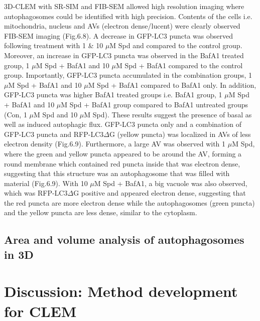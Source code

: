 3D-CLEM with SR-SIM and FIB-SEM allowed high resolution imaging where autophagosomes could be identified with high precision. Contents of the cells i.e. mitochondria, nucleus and AVs (electron dense/lucent) were clearly observed FIB-SEM imaging (Fig.6.8). A decrease in GFP-LC3 puncta was observed following treatment with 1 \& 10 $\mu$M Spd and compared to the control group. Moreover, an increase in GFP-LC3 puncta was observed in the BafA1 treated group, 1 $\mu$M Spd + BafA1 and 10 $\mu$M Spd + BafA1 compared to the control group. Importantly, GFP-LC3 puncta accumulated in the combination groups, 1 $\mu$M Spd + BafA1 and 10 $\mu$M Spd + BafA1 compared to BafA1 only. In addition, GFP-LC3 puncta was higher BafA1 treated groups i.e. BafA1 group, 1 $\mu$M Spd + BafA1 and 10 $\mu$M Spd + BafA1 group compared to BafA1 untreated groups (Con, 1 $\mu$M Spd and 10 $\mu$M Spd). These results suggest the presence of basal as well as induced autophagic flux. GFP-LC3 puncta only and a combination of GFP-LC3 puncta and RFP-LC3$\Delta$G (yellow puncta) was localized in AVs of less electron density (Fig.6.9). Furthermore, a large AV was observed with 1 $\mu$M Spd, where the green and yellow puncta appeared to be around the AV, forming a round membrane which contained red puncta inside that was electron dense, suggesting that this structure was an autophagosome that was filled with material (Fig.6.9). With 10 $\mu$M Spd + BafA1, a big vacuole was also observed, which was RFP-LC3$\Delta$G positive and appeared electron dense, suggesting that the red puncta are more electron dense while the autophagosomes (green puncta) and the yellow puncta are less dense, similar to the cytoplasm. 


\subsection{Area and volume analysis of autophagosomes in 3D}

\section{Discussion: Method development for CLEM}

